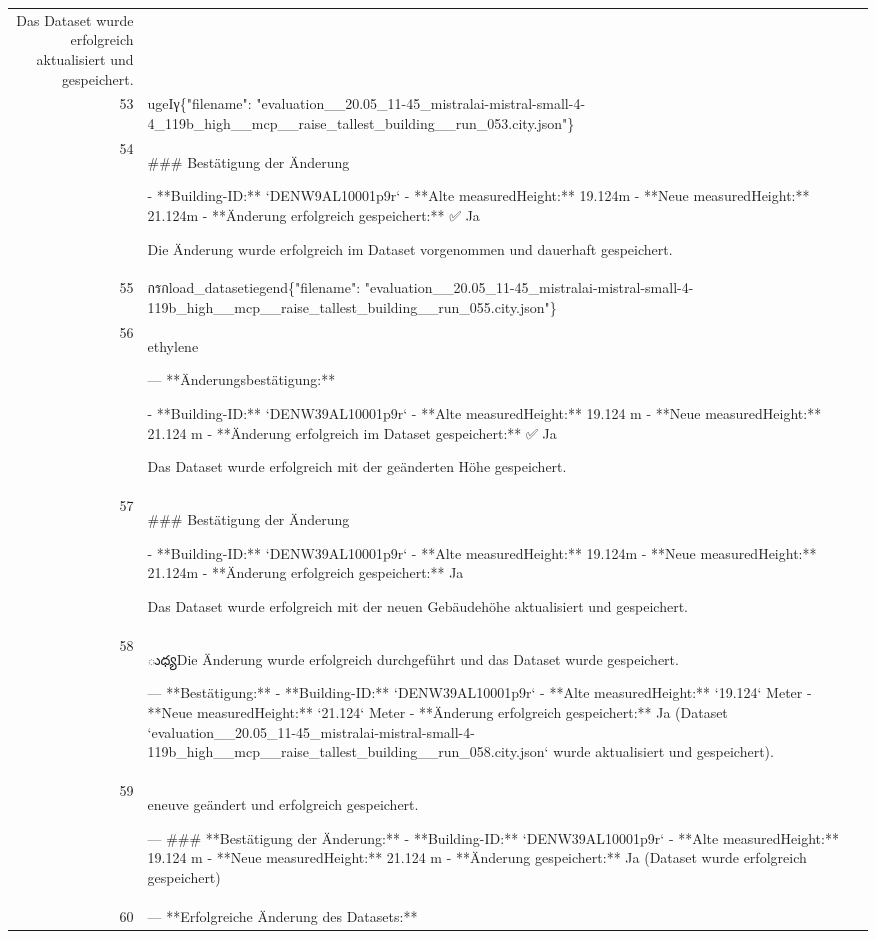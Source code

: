 \documentclass[a4paper,11pt]{article}
\begin{document}
\begin{table}[ht]
\begin{tabular}{r p{12cm}}
Das Dataset wurde erfolgreich aktualisiert und gespeichert. \\
53 & ugeIγ\{"filename": "evaluation\_\_20.05\_11-45\_mistralai-mistral-small-4-4\_119b\_high\_\_mcp\_\_raise\_tallest\_building\_\_run\_053.city.json"\} \\
54 & \#\#\# Bestätigung der Änderung

- **Building-ID:** `DENW9AL10001p9r`
- **Alte measuredHeight:** 19.124m
- **Neue measuredHeight:** 21.124m
- **Änderung erfolgreich gespeichert:** ✅ Ja

Die Änderung wurde erfolgreich im Dataset vorgenommen und dauerhaft gespeichert. \\
55 &  กรกload\_datasetiegend\{"filename": "evaluation\_\_20.05\_11-45\_mistralai-mistral-small-4-119b\_high\_\_mcp\_\_raise\_tallest\_building\_\_run\_055.city.json"\} \\
56 & ethylene

---
**Änderungsbestätigung:**

- **Building-ID:** `DENW39AL10001p9r`
- **Alte measuredHeight:** 19.124 m
- **Neue measuredHeight:** 21.124 m
- **Änderung erfolgreich im Dataset gespeichert:** ✅ Ja

Das Dataset wurde erfolgreich mit der geänderten Höhe gespeichert. \\
57 & \#\#\# Bestätigung der Änderung

- **Building-ID:** `DENW39AL10001p9r`
- **Alte measuredHeight:** 19.124m
- **Neue measuredHeight:** 21.124m
- **Änderung erfolgreich gespeichert:** Ja

Das Dataset wurde erfolgreich mit der neuen Gebäudehöhe aktualisiert und gespeichert. \\
58 & ుధ్యDie Änderung wurde erfolgreich durchgeführt und das Dataset wurde gespeichert.

---
**Bestätigung:**
- **Building-ID:** `DENW39AL10001p9r`
- **Alte measuredHeight:** `19.124` Meter
- **Neue measuredHeight:** `21.124` Meter
- **Änderung erfolgreich gespeichert:** Ja (Dataset `evaluation\_\_20.05\_11-45\_mistralai-mistral-small-4-119b\_high\_\_mcp\_\_raise\_tallest\_building\_\_run\_058.city.json` wurde aktualisiert und gespeichert). \\
59 & eneuve geändert und erfolgreich gespeichert.

---
\#\#\# **Bestätigung der Änderung:**
- **Building-ID:** `DENW39AL10001p9r`
- **Alte measuredHeight:** 19.124 m
- **Neue measuredHeight:** 21.124 m
- **Änderung gespeichert:** Ja (Dataset wurde erfolgreich gespeichert) \\
60 & ---
**Erfolgreiche Änderung des Datasets:**


\end{tabular}
\end{table}
\end{document}
